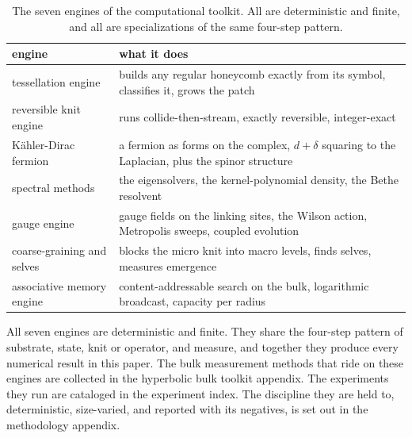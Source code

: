 \begin{table}[ht]
\centering
\begin{tabular}{@{}ll@{}}
\toprule
engine & what it does \\
\midrule
tessellation engine & builds any regular honeycomb exactly from its symbol, classifies it, grows the patch \\
reversible knit engine & runs collide-then-stream, exactly reversible, integer-exact \\
K\"ahler-Dirac fermion & a fermion as forms on the complex, $d + \delta$ squaring to the Laplacian, plus the spinor structure \\
spectral methods & the eigensolvers, the kernel-polynomial density, the Bethe resolvent \\
gauge engine & gauge fields on the linking sites, the Wilson action, Metropolis sweeps, coupled evolution \\
coarse-graining and selves & blocks the micro knit into macro levels, finds selves, measures emergence \\
associative memory engine & content-addressable search on the bulk, logarithmic broadcast, capacity per radius \\
\bottomrule
\end{tabular}
\caption{The seven engines of the computational toolkit. All are deterministic and finite, and all are specializations of the same four-step pattern.}
\label{tab:toolkit-engines}
\end{table}

All seven engines are deterministic and finite. They share the four-step pattern of substrate, state, knit or operator, and measure, and together they produce every numerical result in this paper. The bulk measurement methods that ride on these engines are collected in the hyperbolic bulk toolkit appendix. The experiments they run are cataloged in the experiment index. The discipline they are held to, deterministic, size-varied, and reported with its negatives, is set out in the methodology appendix.
